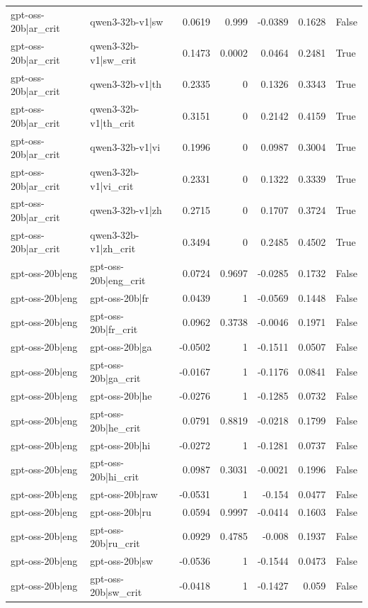 \begin{table}
\begin{tabular}{l l r r r r l}
gpt-oss-20b|ar_crit & qwen3-32b-v1|sw & 0.0619 & 0.999 & -0.0389 & 0.1628 & False \\
gpt-oss-20b|ar_crit & qwen3-32b-v1|sw_crit & 0.1473 & 0.0002 & 0.0464 & 0.2481 & True \\
gpt-oss-20b|ar_crit & qwen3-32b-v1|th & 0.2335 & 0 & 0.1326 & 0.3343 & True \\
gpt-oss-20b|ar_crit & qwen3-32b-v1|th_crit & 0.3151 & 0 & 0.2142 & 0.4159 & True \\
gpt-oss-20b|ar_crit & qwen3-32b-v1|vi & 0.1996 & 0 & 0.0987 & 0.3004 & True \\
gpt-oss-20b|ar_crit & qwen3-32b-v1|vi_crit & 0.2331 & 0 & 0.1322 & 0.3339 & True \\
gpt-oss-20b|ar_crit & qwen3-32b-v1|zh & 0.2715 & 0 & 0.1707 & 0.3724 & True \\
gpt-oss-20b|ar_crit & qwen3-32b-v1|zh_crit & 0.3494 & 0 & 0.2485 & 0.4502 & True \\
gpt-oss-20b|eng & gpt-oss-20b|eng_crit & 0.0724 & 0.9697 & -0.0285 & 0.1732 & False \\
gpt-oss-20b|eng & gpt-oss-20b|fr & 0.0439 & 1 & -0.0569 & 0.1448 & False \\
gpt-oss-20b|eng & gpt-oss-20b|fr_crit & 0.0962 & 0.3738 & -0.0046 & 0.1971 & False \\
gpt-oss-20b|eng & gpt-oss-20b|ga & -0.0502 & 1 & -0.1511 & 0.0507 & False \\
gpt-oss-20b|eng & gpt-oss-20b|ga_crit & -0.0167 & 1 & -0.1176 & 0.0841 & False \\
gpt-oss-20b|eng & gpt-oss-20b|he & -0.0276 & 1 & -0.1285 & 0.0732 & False \\
gpt-oss-20b|eng & gpt-oss-20b|he_crit & 0.0791 & 0.8819 & -0.0218 & 0.1799 & False \\
gpt-oss-20b|eng & gpt-oss-20b|hi & -0.0272 & 1 & -0.1281 & 0.0737 & False \\
gpt-oss-20b|eng & gpt-oss-20b|hi_crit & 0.0987 & 0.3031 & -0.0021 & 0.1996 & False \\
gpt-oss-20b|eng & gpt-oss-20b|raw & -0.0531 & 1 & -0.154 & 0.0477 & False \\
gpt-oss-20b|eng & gpt-oss-20b|ru & 0.0594 & 0.9997 & -0.0414 & 0.1603 & False \\
gpt-oss-20b|eng & gpt-oss-20b|ru_crit & 0.0929 & 0.4785 & -0.008 & 0.1937 & False \\
gpt-oss-20b|eng & gpt-oss-20b|sw & -0.0536 & 1 & -0.1544 & 0.0473 & False \\
gpt-oss-20b|eng & gpt-oss-20b|sw_crit & -0.0418 & 1 & -0.1427 & 0.059 & False \\

\end{tabular}
\end{table}
